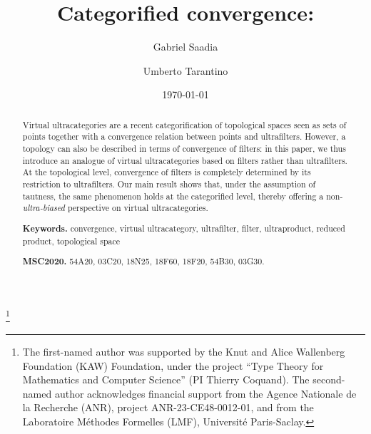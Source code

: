 

\title[Categorified convergence]{%
  Categorified convergence:\\
}

\date{\today}

\author{Gabriel Saadia}
\author{Umberto Tarantino}

\address{
Gabriel \textsc{Saadia} \newline
Department of Mathematics\newline
Stockholm University\newline
Stockholm, Sweden\newline
{}
}

\address{
Umberto \textsc{Tarantino} \newline
Université Paris Cité, CNRS, IRIF, F-75013\newline
Paris, France\newline
\href{mailto:tarantino@irif.fr}{\sf tarantino@irif.fr}
}


\thanks{The first-named author was supported by the Knut and Alice Wallenberg Foundation (KAW) Foundation, under the project ``Type Theory for Mathematics and Computer Science'' (PI Thierry Coquand). The second-named author acknowledges financial support from the Agence Nationale de la Recherche
(ANR), project ANR-23-CE48-0012-01, and from the Laboratoire Méthodes Formelles (LMF), Université Paris-Saclay.}



\begin{abstract}

Virtual ultracategories are a recent categorification of topological spaces seen as sets of points together with a convergence relation between points and ultrafilters. However, a topology can also be described in terms of convergence of filters: in this paper, we thus introduce an analogue of virtual ultracategories based on filters rather than ultrafilters. At the topological level, convergence of filters is completely determined by its restriction to ultrafilters. Our main result shows that, under the assumption of tautness, the same phenomenon holds at the categorified level, thereby offering a non-\emph{ultra-biased} perspective on virtual ultracategories. 


\smallskip \noindent \textbf{Keywords.} convergence, virtual ultracategory, ultrafilter, filter, ultraproduct, reduced product, topological space

\noindent  \textbf{MSC2020.} 54A20, 03C20, 18N25, 18F60, 18F20, 54B30, 03G30.
\end{abstract}

